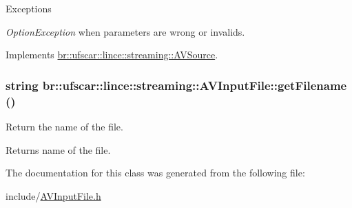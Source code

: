 \begin{DoxyExceptions}{Exceptions}
\item[{\em OptionException}]when parameters are wrong or invalids. \end{DoxyExceptions}


Implements \hyperlink{classbr_1_1ufscar_1_1lince_1_1streaming_1_1AVSource_a728f6eaeafe68040ccd8424627658db3}{br::ufscar::lince::streaming::AVSource}.

\hypertarget{classbr_1_1ufscar_1_1lince_1_1streaming_1_1AVInputFile_a5395f69e91d985691522ae97c6374e37}{
\subsubsection[{getFilename}]{\setlength{\rightskip}{0pt plus 5cm}string br::ufscar::lince::streaming::AVInputFile::getFilename ()}}
\label{classbr_1_1ufscar_1_1lince_1_1streaming_1_1AVInputFile_a5395f69e91d985691522ae97c6374e37}


Return the name of the file. 

\begin{DoxyReturn}{Returns}
name of the file. 
\end{DoxyReturn}


The documentation for this class was generated from the following file:\begin{DoxyCompactItemize}
\item 
include/\hyperlink{AVInputFile_8h}{AVInputFile.h}\end{DoxyCompactItemize}
